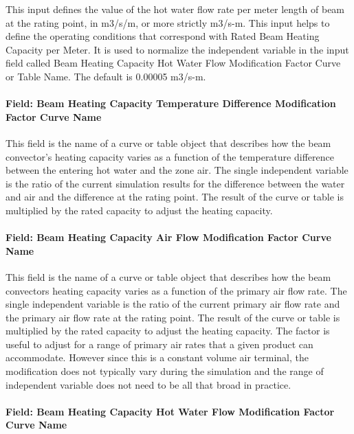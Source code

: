 This input defines the value of the hot water flow rate per meter length of beam at the rating point, in m3/s/m, or more strictly m3/s-m. This input helps to define the operating conditions that correspond with Rated Beam Heating Capacity per Meter. It is used to normalize the independent variable in the input field called Beam Heating Capacity Hot Water Flow Modification Factor Curve or Table Name. The default is 0.00005 m3/s-m.

\paragraph{Field: Beam Heating Capacity Temperature Difference Modification Factor Curve Name}\label{field-beam-heating-capacity-temperature-difference-modification-factor-curve-name}

This field is the name of a curve or table object that describes how the beam convector's heating capacity varies as a function of the temperature difference between the entering hot water and the zone air. The single independent variable is the ratio of the current simulation results for the difference between the water and air and the difference at the rating point. The result of the curve or table is multiplied by the rated capacity to adjust the heating capacity.

\paragraph{Field: Beam Heating Capacity Air Flow Modification Factor Curve Name}\label{field-beam-heating-capacity-air-flow-modification-factor-curve-name}

This field is the name of a curve or table object that describes how the beam convectors heating capacity varies as a function of the primary air flow rate. The single independent variable is the ratio of the current primary air flow rate and the primary air flow rate at the rating point. The result of the curve or table is multiplied by the rated capacity to adjust the heating capacity. The factor is useful to adjust for a range of primary air rates that a given product can accommodate. However since this is a constant volume air terminal, the modification does not typically vary during the simulation and the range of independent variable does not need to be all that broad in practice.

\paragraph{Field: Beam Heating Capacity Hot Water Flow Modification Factor Curve Name}\label{field-beam-heating-capacity-hot-water-flow-modification-factor-curve-name}

